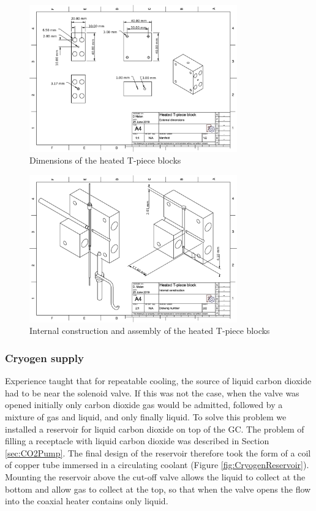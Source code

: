 \begin{figure}
	\centering
	\includegraphics[angle=90, origin=c, width=0.8\textwidth]{./Figures/ManifoldDimensions.pdf}
	\decoRule
	\caption[Manifold dimensions.]{Dimensions of the heated T-piece blocks}	
	\label{fig:ManifoldDims}
\end{figure}

\begin{figure}
	\centering
	\includegraphics[angle=90, origin=c, width=0.8\textwidth]{./Figures/ManifoldAssemby.pdf}
	\decoRule	
	\caption[Manifold assembly.]{Internal construction and assembly of the heated T-piece blocks}
	\label{fig:ManifoldAssy}
\end{figure}


\subsubsection{Cryogen supply}

Experience taught that for repeatable cooling, the source of liquid carbon
dioxide had to be near the solenoid valve. If this was not the case, when the
valve was opened initially only carbon dioxide gas would be admitted, followed
by a mixture of gas and liquid, and only finally liquid. To solve this problem
we installed a reservoir for liquid carbon dioxide on top of the GC. The problem
of filling a receptacle with liquid carbon dioxide was described in Section
\ref{sec:CO2Pump}. The final design of the reservoir therefore took the form of
a coil of copper tube immersed in a circulating coolant (Figure
\ref{fig:CryogenReservoir}). Mounting the reservoir above the cut-off valve
allows the liquid to collect at the bottom and allow gas to collect at the top,
so that when the valve opens the flow into the coaxial heater contains only
liquid.

